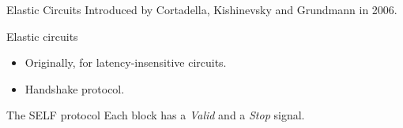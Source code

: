 \documentclass[page number]{beamer}
\begin{document}
\begin{frame}{Elastic Circuits}
  Introduced by Cortadella, Kishinevsky and Grundmann in 2006.
  \vfill
  \begin{block}{Elastic circuits}
    \begin{itemize}
    \item Originally, for latency-insensitive circuits.
    \item Handshake protocol.
    \end{itemize}
  \end{block}
  \vfill
  \begin{block}{The SELF protocol}
    Each block has a \textit{Valid} and a \textit{Stop} signal.
  \end{block}
      
\end{frame}
\end{document}
